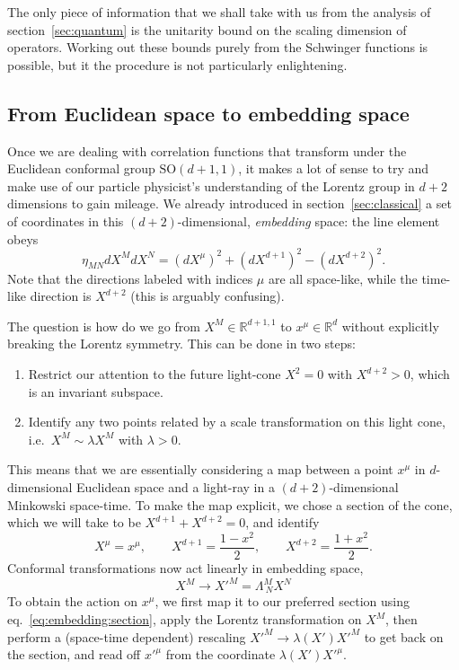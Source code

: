 \documentclass[a4paper,12pt]{article}
\newcommand{\SO}{\text{SO}}
\numberwithin{equation}{section}
\begin{document}
The only piece of information that we shall take with us from the analysis of section~\ref{sec:quantum} is the unitarity bound on the scaling dimension of operators. Working out these bounds purely from the Schwinger functions is possible, but it the procedure is not particularly enlightening.


\subsection{From Euclidean space to embedding space}

Once we are dealing with correlation functions that transform under the Euclidean conformal group $\SO(d + 1, 1)$, it makes a lot of sense to try and make use of our particle physicist's understanding of the Lorentz group in $d+2$ dimensions to gain mileage. We already introduced in section~\ref{sec:classical} a set of coordinates in this  $(d+2)$-dimensional, \emph{embedding} space: the line element obeys
\begin{equation}
	\eta_{MN} dX^M dX^N
	= (dX^\mu)^2 + (dX^{d+1})^2 - (dX^{d+2})^2.
\end{equation}
Note that the directions labeled with indices $\mu$ are all space-like,  while the time-like direction is $X^{d+2}$ (this is arguably confusing).

The question is how do we go from $X^M \in \mathbb{R}^{d+1,1}$ to $x^\mu \in \mathbb{R}^d$ without explicitly breaking the Lorentz symmetry. This can be done in two steps:
%
\begin{enumerate}

\item
Restrict our attention to the future light-cone $X^2 = 0$ with $X^{d+2} > 0$, which is an invariant subspace.

\item
Identify any two points related by a scale transformation on this light cone, i.e.~$X^M \sim \lambda X^M$ with $\lambda > 0$.

\end{enumerate}
%
This means that we are essentially considering a map between a point $x^\mu$ in $d$-dimensional Euclidean space and a light-ray in a $(d + 2)$-dimensional Minkowski space-time.
To make the map explicit, we chose a section of the cone, which we will take to be $X^{d+1} + X^{d+2} = 0$,
and identify
\begin{equation}
	X^\mu = x^\mu,
	\qquad
	X^{d+1} = \frac{1 - x^2}{2},
	\qquad
	X^{d+2} = \frac{1 + x^2}{2}.
	\label{eq:embedding:section}
\end{equation}
Conformal transformations now act linearly in embedding space,
\begin{equation}
	X^M \to X'^M = \Lambda^M_{~N} X^N
\end{equation}
To obtain the action on $x^\mu$, we first map it to our preferred section using eq.~\eqref{eq:embedding:section}, apply the Lorentz transformation on $X^M$, then perform a (space-time dependent) rescaling $X'^M \to \lambda(X') X'^M$ to get back on the section, and read off $x'^\mu$ from the coordinate $\lambda(X') X'^\mu$.
\end{document}
